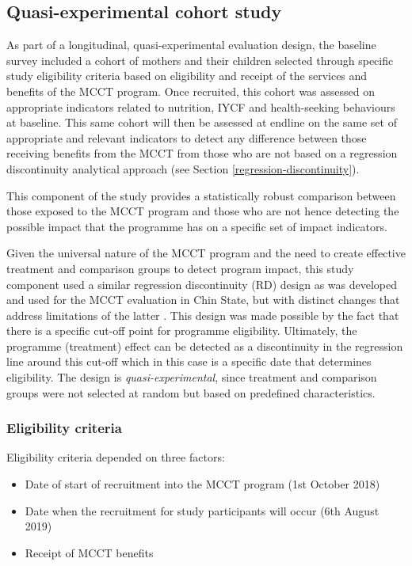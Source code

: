\documentclass[12pt,a4paper]{article}
\begin{document}
\hypertarget{study2}{%
\subsection{Quasi-experimental cohort study}\label{study2}}

As part of a longitudinal, quasi-experimental evaluation design, the baseline survey included a cohort of mothers and their children selected through specific study eligibility criteria based on eligibility and receipt of the services and benefits of the MCCT program. Once recruited, this cohort was assessed on appropriate indicators related to nutrition, IYCF and health-seeking behaviours at baseline. This same cohort will then be assessed at endline on the same set of appropriate and relevant indicators to detect any difference between those receiving benefits from the MCCT from those who are not based on a regression discontinuity analytical approach (see Section \ref{regression-discontinuity}).

This component of the study provides a statistically robust comparison between those exposed to the MCCT program and those who are not hence detecting the possible impact that the programme has on a specific set of impact indicators.

Given the universal nature of the MCCT program and the need to create effective treatment and comparison groups to detect program impact, this study component used a similar regression discontinuity (RD) design as was developed and used for the MCCT evaluation in Chin State, but with distinct changes that address limitations of the latter \citep{MinistryofSocialWelfareReliefandResettlement2018}. This design was made possible by the fact that there is a specific cut-off point for programme eligibility. Ultimately, the programme (treatment) effect can be detected as a discontinuity in the regression line around this cut-off which in this case is a specific date that determines eligibility. The design is \emph{quasi-experimental}, since treatment and comparison groups were not selected at random but based on predefined characteristics.

\hypertarget{eligibility-criteria}{%
\subsubsection{Eligibility criteria}\label{eligibility-criteria}}

Eligibility criteria depended on three factors:

\begin{itemize}
\item
  Date of start of recruitment into the MCCT program (1st October 2018)
\item
  Date when the recruitment for study participants will occur (6th August 2019)
\item
  Receipt of MCCT benefits
\end{itemize}
\end{document}
